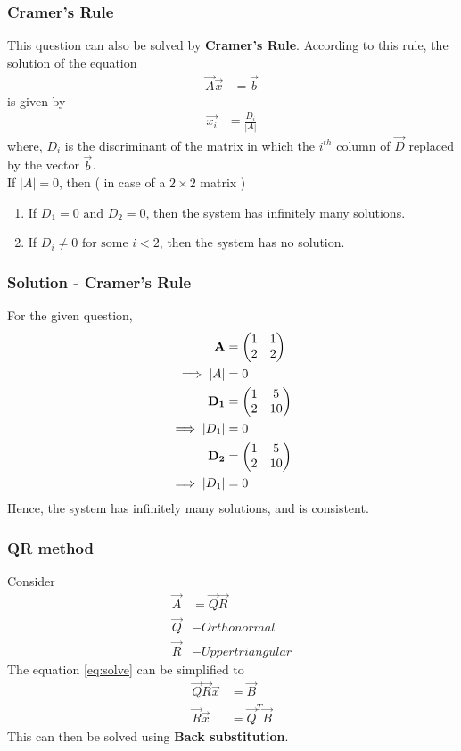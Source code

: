 \documentclass{beamer}
\begin{document}
\begin{frame}
\frametitle{Cramer's Rule}
This question can also be solved by \textbf{Cramer's Rule}. According to this rule, the solution of the equation
\begin{align}
	\vec{A} \vec{x} &= \vec{b} \label{eq:solve}
\end{align}
is given by
\begin{align}
	\vec{x_{i}} &= \frac{D_{i}}{|A|}
\end{align}
where, $D_{i}$ is the discriminant of the matrix in which the $i^{th}$ column of $\vec{D}$ replaced by the vector $\vec{b}$. \\
If $|A| = 0$, then ( in case of a $2 \times 2$ matrix )
\begin{enumerate}
	\item If $D_{1} = 0 \text{ and } D_{2} = 0$, then the system has infinitely many solutions. 
	\item If $D_{i} \neq 0 \text{ for some } i < 2$, then the system has no solution.
\end{enumerate}
\end{frame}

\begin{frame}
\frametitle{Solution - Cramer's Rule}

For the given question, 
\begin{align}
	\mathbf{A} &= \begin{pmatrix}1 & 1 \\ 2 & 2\end{pmatrix} \\
	\implies |A| &= 0 \\
	\mathbf{D_{1}} &= \begin{pmatrix}1 & 5 \\ 2 & 10\end{pmatrix} \\
	\implies |D_{1}| &= 0 \\
	\mathbf{D_{2}} &= \begin{pmatrix}1 & 5 \\ 2 & 10\end{pmatrix} \\
	\implies |D_{1}| &= 0 
\end{align}
Hence, the system has infinitely many solutions, and is consistent.
\end{frame}

\begin{frame}
\frametitle{QR method}
Consider
\begin{align}
	\vec{A} &= \vec{Q} \vec{R} \\
	\vec{Q} &- Orthonormal \\
	\vec{R} &- Upper triangular
\end{align}
The equation \eqref{eq:solve} can be simplified to
\begin{align}
	\vec{Q} \vec{R} \vec{x} &= \vec{B} \\
	\vec{R} \vec{x} &= \vec{Q}^{T} \vec{B}
\end{align}
This can then be solved using \textbf{Back substitution}.
\end{frame}
\end{document}
